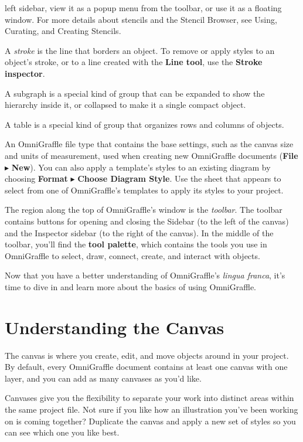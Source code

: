 \documentclass[../main.tex]{subfiles}
\begin{document}
\begin{description}[
      style=nextline,
    ]
    left sidebar,
    view it as a popup menu from the toolbar, or use it as a floating window. For more details
    about stencils
    and the Stencil Browser, see Using, Curating, and Creating Stencils.
  \item[Stroke] A \textit{stroke} is the line that borders an object. To remove or apply styles
    to an
    object's stroke, or to a line created with the \textbf{Line tool}, use the \textbf{Stroke
    inspector}.
  \item[Subgraph] A subgraph is a special kind of group that can be expanded to show the
    hierarchy inside it,
    or collapsed to make it a single compact object.
  \item[Table] A table is a special kind of group that organizes rows and columns of objects.
  \item[Template] An OmniGraffle file type that contains the base settings, such as the canvas
    size and units
    of measurement, used when creating new OmniGraffle documents (\textbf{File}
      $\blacktriangleright$
    \textbf{New}). You can also apply a template's styles to an existing diagram by choosing
    \textbf{Format}
    $\blacktriangleright$ \textbf{Choose Diagram Style}. Use the sheet that appears to select
    from one of
    OmniGraffle's templates to apply its styles to your project.
  \item[Toolbar, Tool Palette, and Tools] The region along the top of OmniGraffle's window is
    the
    \textit{toolbar}. The toolbar contains buttons for opening and closing the Sidebar (to the
      left of the
    canvas) and the Inspector sidebar (to the right of the canvas). In the middle of the
    toolbar, you'll find
    the \textbf{tool palette}, which contains the tools you use in OmniGraffle to select, draw,
    connect,
    create, and interact with objects.
\end{description}
Now that you have a better understanding of OmniGraffle's \textit{lingua franca}, it's time to
dive in and
learn more about the basics of using OmniGraffle.

\section{Understanding the Canvas}
The canvas is where you create, edit, and move objects around in your project. By default, every
OmniGraffle
document contains at least one canvas with one layer, and you can add as many canvases as you'd
like.

Canvases give you the flexibility to separate your work into distinct areas within the same
project file. Not
sure if you like how an illustration you've been working on is coming together? Duplicate the
canvas and
apply a new set of styles so you can see which one you like best.
\end{document}
